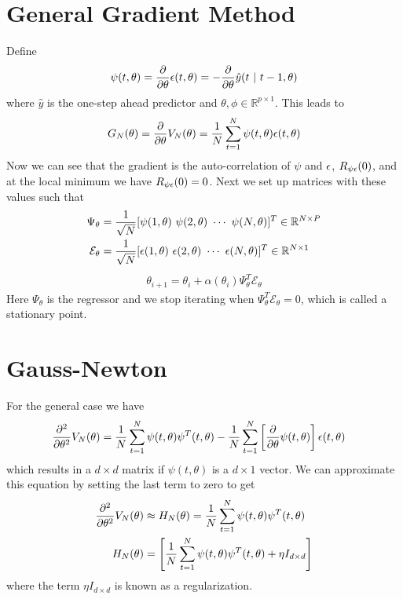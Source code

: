 \section{General Gradient Method}
Define
$$\psi(t,\theta) = \frac{\partial}{\partial\theta}\epsilon(t,\theta) = -\frac{\partial}{\partial\theta}\hat{y}(t~|~t-1,\theta)$$
where $\hat{y}$ is the one-step ahead predictor and $\theta,\phi\in\mathbb{R}^{p\times1}$. This leads to
$$G_N(\theta) = \frac{\partial}{\partial\theta}V_N(\theta) = \frac{1}{N}\sum_{t=1}^N\psi(t,\theta)\epsilon(t,\theta)$$
Now we can see that the gradient is the auto-correlation of $\psi$ and $\epsilon$, $R_{\psi\epsilon}(0)$, and at the local minimum we have $R_{\psi\epsilon}(0)=0$. Next we set up matrices with these values such that
\begin{align*}
\Psi_\theta &= \frac{1}{\sqrt{N}} [\psi(1,\theta) ~ \psi(2,\theta) ~ \cdots ~ \psi(N,\theta)]^T\in\mathbb{R}^{N\times P} \\
\mathcal{E}_\theta &= \frac{1}{\sqrt{N}} [\epsilon(1,\theta) ~ \epsilon(2,\theta) ~ \cdots ~ \epsilon(N,\theta)]^T\in\mathbb{R}^{N\times1}
\end{align*}
\begin{align*}
\boxed{\theta_{i+1} = \theta_i + \alpha(\theta_i)\Psi_\theta^T\mathcal{E}_\theta}
\end{align*}
Here $\Psi_\theta$ is the regressor and we stop iterating when $\Psi_\theta^T\mathcal{E}_\theta=0$, which is called a stationary point.

\section{Gauss-Newton}
For the general case we have
\begin{align*}
\frac{\partial^2}{\partial\theta^2}V_N(\theta) &= \frac{1}{N}\sum_{t=1}^N\psi(t,\theta)\psi^T(t,\theta) - \frac{1}{N}\sum_{t=1}^N\left[\frac{\partial}{\partial\theta}\psi(t,\theta)\right]\epsilon(t,\theta)
\end{align*}
which results in a $d\times d$ matrix if $\psi(t,\theta)$ is a $d\times1$ vector. We can approximate this equation by setting the last term to zero to get
\begin{align}
\label{eq:18hn}
\frac{\partial^2}{\partial\theta^2}V_N(\theta) &\approx H_N(\theta) = \frac{1}{N}\sum_{t=1}^N\psi(t,\theta)\psi^T(t,\theta) \\
\label{eq:18hnalt}
H_N(\theta) &= \left[\frac{1}{N}\sum_{t=1}^N\psi(t,\theta)\psi^T(t,\theta) + \eta I_{d\times d}\right]
\end{align}
where the term $\eta I_{d\times d}$ is known as a regularization.

